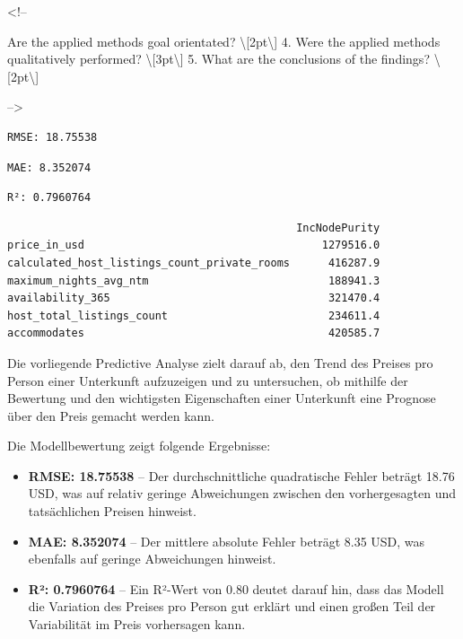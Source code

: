 \documentclass[
  journal,
]{IEEEtran}%
\begin{document}
\textless!--

Are the applied methods goal orientated?
\textbackslash{[}2pt\textbackslash{]} 4. Were the applied methods
qualitatively performed? \textbackslash{[}3pt\textbackslash{]} 5. What
are the conclusions of the findings?
\textbackslash{[}2pt\textbackslash{]}

--\textgreater{}

\begin{verbatim}
RMSE: 18.75538 
\end{verbatim}

\begin{verbatim}
MAE: 8.352074 
\end{verbatim}

\begin{verbatim}
R²: 0.7960764 
\end{verbatim}

\begin{verbatim}
                                             IncNodePurity
price_in_usd                                     1279516.0
calculated_host_listings_count_private_rooms      416287.9
maximum_nights_avg_ntm                            188941.3
availability_365                                  321470.4
host_total_listings_count                         234611.4
accommodates                                      420585.7
\end{verbatim}

Die vorliegende Predictive Analyse zielt darauf ab, den Trend des
Preises pro Person einer Unterkunft aufzuzeigen und zu untersuchen, ob
mithilfe der Bewertung und den wichtigsten Eigenschaften einer
Unterkunft eine Prognose über den Preis gemacht werden kann.

Die Modellbewertung zeigt folgende Ergebnisse:

\begin{itemize}
\item
  \textbf{RMSE: 18.75538} -- Der durchschnittliche quadratische Fehler
  beträgt 18.76 USD, was auf relativ geringe Abweichungen zwischen den
  vorhergesagten und tatsächlichen Preisen hinweist.
\item
  \textbf{MAE: 8.352074} -- Der mittlere absolute Fehler beträgt 8.35
  USD, was ebenfalls auf geringe Abweichungen hinweist.
\item
  \textbf{R²: 0.7960764} -- Ein R²-Wert von 0.80 deutet darauf hin, dass
  das Modell die Variation des Preises pro Person gut erklärt und einen
  großen Teil der Variabilität im Preis vorhersagen kann.
\end{itemize}
\end{document}
